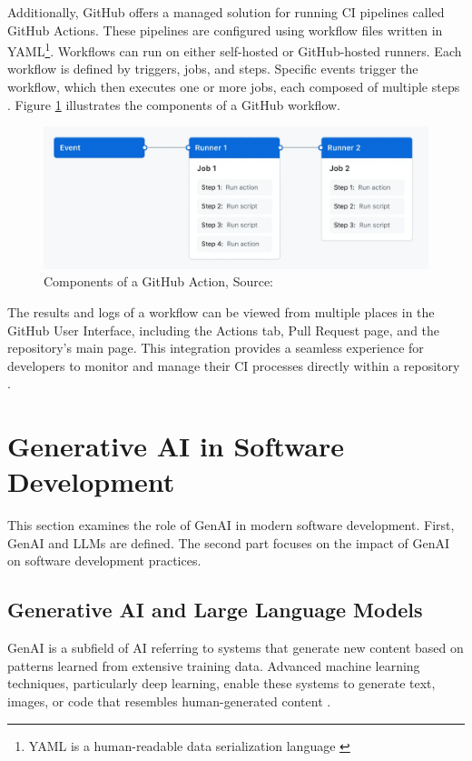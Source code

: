 Additionally, GitHub offers a managed solution for running CI pipelines called GitHub Actions. These pipelines are configured using workflow files written in YAML\footnote{YAML is a human-readable data serialization language \cite{OfficialYAMLWeb}}. Workflows can run on either self-hosted or GitHub-hosted runners. Each workflow is defined by triggers, jobs, and steps. Specific events trigger the workflow, which then executes one or more jobs, each composed of multiple steps \cite{UnderstandingGitHubActionsa}. Figure \ref{fig:gh-workflow} illustrates the components of a GitHub workflow.

\begin{figure}[H]
    \centering
    \includegraphics[width=1\textwidth]{images/overview-actions-simple.png}
    \caption{Components of a GitHub Action, Source:~\cite{UnderstandingGitHubActionsa}}
    \label{fig:gh-workflow}
\end{figure}

The results and logs of a workflow can be viewed from multiple places in the GitHub User Interface, including the Actions tab, Pull Request page, and the repository's main page. This integration provides a seamless experience for developers to monitor and manage their CI processes directly within a repository \cite{GitHubActions2025}.


\section{Generative AI in Software Development}

This section examines the role of \ac{GenAI} in modern software development. First, \ac{GenAI} and \acp{LLM} are defined. The second part focuses on the impact of \ac{GenAI} on software development practices.

\subsection{Generative AI and Large Language Models}
\ac{GenAI} is a subfield of \ac{AI} referring to systems that generate new content based on patterns learned from extensive training data. Advanced machine learning techniques, particularly deep learning, enable these systems to generate text, images, or code that resembles human-generated content \cite{WhatGenerativeAI2021}.

